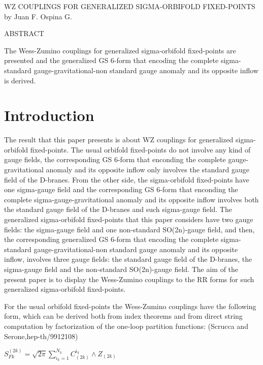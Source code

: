 \documentclass[a4paper,a4paper]{article}
\begin{document}
\begin{center}
WZ COUPLINGS FOR GENERALIZED SIGMA-ORBIFOLD FIXED-POINTS \\ [.25in]
by Juan F. Ospina G.
\end{center}
\begin{center}
ABSTRACT \\ [.25in]
\end{center}
The Wess-Zumino couplings for generalized sigma-orbifold fixed-points  are presented and the generalized GS 6-form that encoding the complete sigma-standard gauge-gravitational-non standard gauge anomaly and its opposite inflow is derived.


\section{Introduction}
The result that this paper presents is about WZ couplings for generalized sigma-orbifold fixed-points. The usual orbifold fixed-points do not involve any kind of  gauge fields, the corresponding GS 6-form that enconding the complete gauge-gravitational anomaly and its opposite inflow only involves the standard gauge field of the D-branes.
From the other side, the sigma-orbifold fixed-points  have one sigma-gauge  field and  the corresponding GS 6-form that enconding the complete sigma-gauge-gravitational anomaly and its opposite inflow involves both the standard gauge field of the D-branes and such sigma-gauge field. 
The generalized sigma-orbifold fixed-points that this paper considers have two gauge fields: the sigma-gauge field and one non-standard SO(2n)-gauge field, and then, the corresponding generalized GS 6-form that encoding the complete sigma-standard gauge-gravitational-non standard gauge anomaly and its opposite inflow, involves three gauge fields: the standard gauge field of the D-branes, the sigma-gauge field and the non-standard SO(2n)-gauge field.  
The aim of the present paper is to display the Wess-Zumino couplings to the
RR forms for such generalized sigma-orbifold fixed-points.

For the usual orbifold fixed-points the Wess-Zumino couplings have the following form, which can be derived both from index theorems and from direct string computation by factorization of the one-loop partition functions: (Scrucca and Serone,hep-th/9912108)  

\begin{center}
{  $ S_{Fk}^{(2k)} = \sqrt{2\pi}\sum_{i_k=1}^{N_k}C_{(2k)}^{i_k}\wedge{Z_{(2k)}}$ }
\end{center}
\end{document}
